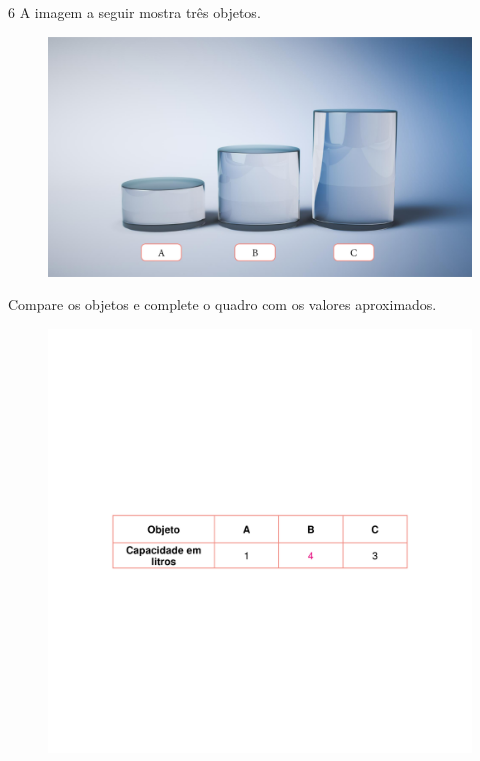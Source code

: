 
\num{6} A imagem a seguir mostra três objetos.


\begin{figure}[htpb!]
\centering
\includegraphics[width=.8\textwidth]{./media/image34.png}
\end{figure}

Compare os objetos e complete o quadro com os valores aproximados.

\begin{figure}[htpb!]
\includegraphics[width=\textwidth]{./media/image35_prof.png}
\end{figure}

